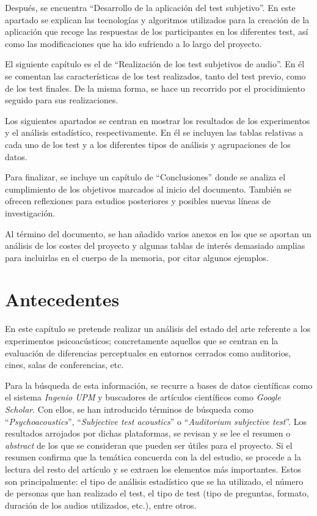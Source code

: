 \documentclass[11pt,a4paper]{book}
\begin{document}
        Después, se encuentra ``Desarrollo de la aplicación del test subjetivo''. En este apartado se explican las tecnologías y algoritmos utilizados para la creación de la aplicación que recoge las respuestas de los participantes en los diferentes test, así como las modificaciones que ha ido sufriendo a lo largo del proyecto.
        
        El siguiente capítulo es el de ``Realización de los test subjetivos de audio''. En él se comentan las características de los test realizados, tanto del test previo, como de los test finales. De la misma forma, se hace un recorrido por el procidimiento seguido para sus realizaciones.
        
        Los siguientes apartados se centran en mostrar los resultados de los experimentos y el análisis estadístico, respectivamente. En él se incluyen las tablas relativas a cada uno de los test y a los diferentes tipos de análisis y agrupaciones de los datos.
        
        Para finalizar, se incluye un capítulo de ``Conclusiones'' donde se analiza el cumplimiento de los objetivos marcados al inicio del documento. También se ofrecen reflexiones para estudios posteriores y posibles nuevas líneas de investigación.
        
        Al término del documento, se han añadido varios anexos en los que se aportan un análisis de los costes del proyecto y algunas tablas de interés demasiado amplias para incluirlas en el cuerpo de la memoria, por citar algunos ejemplos.

\chapter{Antecedentes}
    En este capítulo se pretende realizar un análisis del estado del arte referente a los experimentos psicoacústicos; concretamente aquellos que se centran en la evaluación de diferencias perceptuales en entornos cerrados como auditorios, cines, salas de conferencias, etc.
    
    Para la búsqueda de esta información, se recurre a bases de datos científicas como el sistema \textit{Ingenio UPM} y buscadores de artículos científicos como \textit{Google Scholar}. Con ellos, se han introducido términos de búsqueda como ``\textit{Psychoacoustics}'', ``\textit{Subjective test acoustics}'' o ``\textit{Auditorium subjective test}''. Los resultados arrojados por dichas plataformas, se revisan y se lee el resumen o \textit{abstract} de los que se consideran que pueden ser útiles para el proyecto. Si el resumen confirma que la temática concuerda con la del estudio, se procede a la lectura del resto del artículo y se extraen los elementos más importantes. Estos son principalmente: el tipo de análisis estadístico que se ha utilizado, el número de personas que han realizado el test, el tipo de test (tipo de preguntas, formato, duración de los audios utilizados, etc.), entre otros.
    
\end{document}
